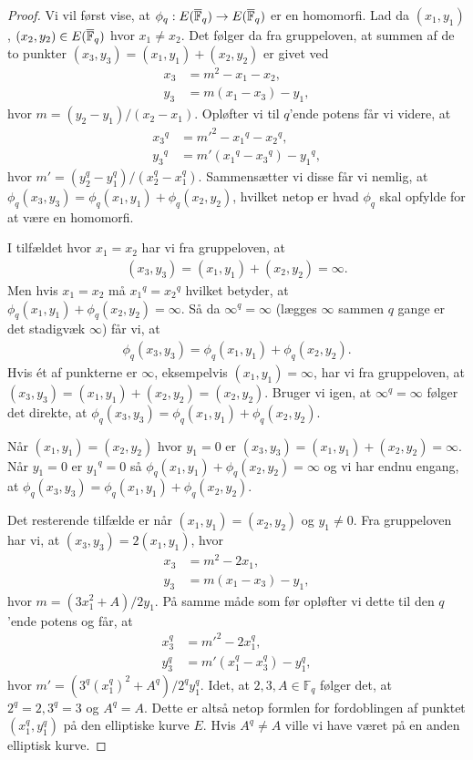 \begin{proof}
Vi vil først vise, at $\phi_q : E(\overline{\mathbb{F}}_q) \to E(\overline{\mathbb{F}}_q)$ er en homomorfi. Lad da $(x_1, y_1)$, $(x_2, y_2) \in E(\overline{\mathbb{F}}_q)$ hvor $x_1 \neq x_2$. Det følger da fra gruppeloven, at summen af de to punkter $(x_3, y_3) = (x_1, y_1) + (x_2, y_2)$ er givet ved
\begin{align*}
	x_3 &= m^2 - x_1 - x_2, \\
	y_3 &= m(x_1 - x_3) - y_1, 
\end{align*}
hvor $m=(y_2-y_1)/(x_2-x_1)$.
Opløfter vi til $q$'ende potens får vi videre, at  
\begin{align*}
	{x_3}^q &= {m'}^2 - {x_1}^q - {x_2}^q, \\
	{y_3}^q &= m'({x_1}^q - {x_3}^q) - {y_1}^q,
\end{align*}
hvor $m' = (y_{2}^{q} - y_{1}^{q})/(x_{2}^{q} - x_{1}^{q})$. Sammensætter vi disse får vi nemlig, at $\phi_q(x_3, y_3) = \phi_q(x_1, y_1) + \phi_q(x_2, y_2)$, hvilket netop er hvad $\phi_q$ skal opfylde for at være en homomorfi. 

I tilfældet hvor $x_1=x_2$ har vi fra gruppeloven, at 
\begin{align*}
	(x_3, y_3) =(x_1, y_1) + (x_2, y_2) = \infty.
\end{align*}
Men hvis $x_1 = x_2$ må ${x_1}^q = {x_2}^q$ hvilket betyder, at $\phi_q(x_1, y_1)+\phi_q(x_2, y_2) = \infty$. Så da $\infty^q = \infty$ (lægges $\infty$ sammen $q$ gange er det stadigvæk $\infty$) får vi, at 
\begin{align*}
	\phi_q(x_3, y_3) = \phi_q(x_1, y_1) + \phi_q(x_2,  y_2).
\end{align*}
Hvis ét af punkterne er $\infty$, eksempelvis $(x_1, y_1)=\infty$, har vi fra gruppeloven, at 
$(x_3, y_3) = (x_1, y_1)+(x_2, y_2) = (x_2, y_2)$. Bruger vi igen, at $\infty^q = \infty$ følger det direkte, at 
$\phi_q(x_3, y_3) = \phi_q(x_1, y_1) + \phi_q(x_2, y_2)$.

Når $(x_1, y_1)=(x_2, y_2)$ hvor $y_1 = 0$ er $(x_3, y_3) = (x_1, y_1)+(x_2, y_2) = \infty$. Når $y_1=0$ er ${y_1}^q=0$ så $\phi_q(x_1, y_1) + \phi_q(x_2, y_2) = \infty$ og vi har endnu engang, at $\phi_q(x_3, y_3) = \phi_q(x_1, y_1) + \phi_q(x_2, y_2)$. 

Det resterende tilfælde er når $(x_1, y_1)=(x_2, y_2)$ og $y_1 \neq 0$. Fra gruppeloven har vi, at 
$(x_3, y_3)= 2(x_1, y_1)$, hvor
\begin{align*}
	x_3 &= m^2 - 2x_1, \\
	y_3 &= m(x_1-x_3)-y_1,
\end{align*}
hvor $m=(3x_{1}^{2} + A)/2y_1$. På samme måde som før opløfter vi dette til den $q$'ende potens og får, at 
\begin{align*}
	x_{3}^{q} &= {m'}^2 - 2 x_{1}^{q}, \\
	y_{3}^{q} &= m'(x_{1}^{q}- x_{3}^{q}) - y_{1}^{q},
\end{align*}
hvor $m' = (3^q (x_{1}^{q})^2 + A^q)/2^q y_{1}^{q}$.
Idet, at $2, 3, A \in \mathbb{F}_q$ følger det, at $2^q = 2, 3^q = 3$ og $A^q = A$. Dette er altså netop formlen for fordoblingen af punktet $(x_{1}^{q}, y_{1}^{q})$ på den elliptiske kurve $E$. Hvis $A^q \neq A$ ville vi have været på en anden elliptisk kurve.


\end{proof}
